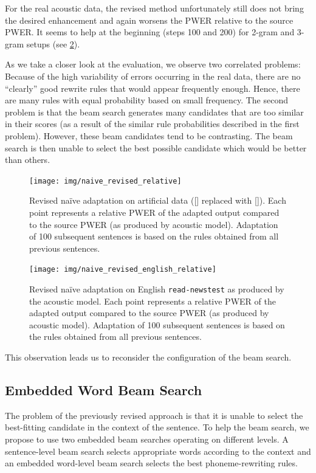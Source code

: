 For the real acoustic data, the revised method unfortunately still does not bring the desired enhancement and again worsens the PWER relative to the source PWER. It seems to help at the beginning (steps 100 and 200) for 2-gram and 3-gram setups (see \cref{fig:naive_revised_en}). 

As we take a closer look at the evaluation, we observe two correlated problems: Because of the high variability of errors occurring in the real data, there are no ``clearly'' good rewrite rules that would appear frequently enough. Hence, there are many rules with equal probability based on small frequency. The second problem is that the beam search generates many candidates that are too similar in their scores (as a result of the similar rule probabilities described in the first problem). However, these beam candidates tend to be contrasting. The beam search is then unable to select the best possible candidate which would be better than others.

\begin{figure}[h]
    \texttt{[image: img/naive\_revised\_relative]}
    \caption[Revised na\"ive adaptation on artificial data]{Revised na\"ive adaptation on artificial data ([] replaced with []). Each point represents a relative PWER of the adapted output compared to the source PWER (as produced by acoustic model). Adaptation of 100 subsequent sentences is based on the rules obtained from all previous sentences.}
    \label{fig:naive_revised} 
\end{figure}

\begin{figure}[h]
    \texttt{[image: img/naive\_revised\_english\_relative]}
    \caption[Revised na\"ive adaptation on English]{Revised na\"ive adaptation on English \texttt{read-newstest} as produced by the acoustic model. Each point represents a relative PWER of the adapted output compared to the source PWER (as produced by acoustic model). Adaptation of 100 subsequent sentences is based on the rules obtained from all previous sentences.}
    \label{fig:naive_revised_en} 
\end{figure}

This observation leads us to reconsider the configuration of the beam search.

\subsection{Embedded Word Beam Search}
The problem of the previously revised approach is that it is unable to select the best-fitting candidate in the context of the sentence. To help the beam search, we propose to use two embedded beam searches operating on different levels. A sentence-level beam search selects appropriate words according to the context and an embedded word-level beam search selects the best phoneme-rewriting rules.

